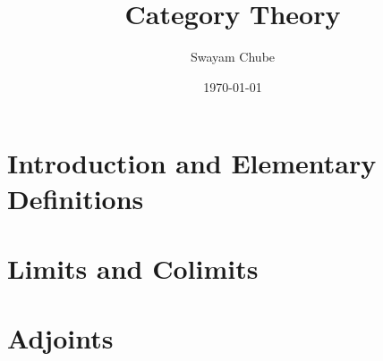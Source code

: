 \documentclass{report}
\title{Category Theory}
\author{Swayam Chube}
\date{\today}
\begin{document}
\maketitle
\tableofcontents

\chapter{Introduction and Elementary Definitions}


\chapter{Limits and Colimits}


\chapter{Adjoints}

\end{document}
